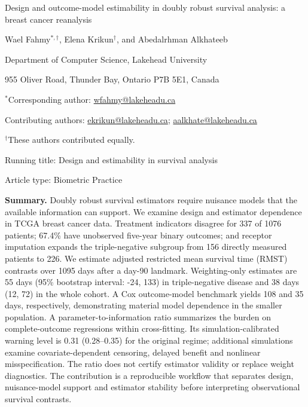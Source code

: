 \documentclass[12pt,letterpaper]{article}
\begin{document}
\begin{titlepage}
\centering
\vspace*{1cm}
{\Large Design and outcome-model estimability in doubly robust survival analysis: a breast cancer reanalysis\par}
\vspace{1cm}
Wael Fahmy$^{*,\dagger}$, Elena Krikun$^{\dagger}$, and Abedalrhman Alkhateeb\par
Department of Computer Science, Lakehead University\par
955 Oliver Road, Thunder Bay, Ontario P7B 5E1, Canada\par
\vspace{1cm}
$^*$Corresponding author: \href{mailto:wfahmy@lakeheadu.ca}{wfahmy@lakeheadu.ca}\par
Contributing authors: \href{mailto:ekrikun@lakeheadu.ca}{ekrikun@lakeheadu.ca};
\href{mailto:aalkhate@lakeheadu.ca}{aalkhate@lakeheadu.ca}\par
$^\dagger$These authors contributed equally.\par
\vfill
Running title: Design and estimability in survival analysis\par
Article type: Biometric Practice\par
\end{titlepage}
\noindent\textbf{Summary.}
Doubly robust survival estimators require nuisance models that the available information can support.
We examine design and estimator dependence in TCGA breast cancer data.
Treatment indicators disagree for 337 of 1076 patients;
67.4\% have unobserved five-year binary outcomes; and receptor imputation expands
the triple-negative subgroup from 156 directly measured patients to 226.
We estimate adjusted restricted mean survival time (RMST) contrasts over 1095 days after a day-90 landmark.
Weighting-only estimates are 55 days (95\% bootstrap interval: -24, 133)
in triple-negative disease and 38 days (12, 72) in the whole cohort.
A Cox outcome-model benchmark yields 108 and 35 days, respectively,
demonstrating material model dependence in the smaller population.
A parameter-to-information ratio summarizes the burden on complete-outcome regressions within cross-fitting.
Its simulation-calibrated warning level is 0.31 (0.28--0.35) for the original regime;
additional simulations examine covariate-dependent censoring, delayed benefit and nonlinear misspecification.
The ratio does not certify estimator validity or replace weight diagnostics.
The contribution is a reproducible workflow that separates design, nuisance-model support and estimator stability
before interpreting observational survival contrasts.
\end{document}
